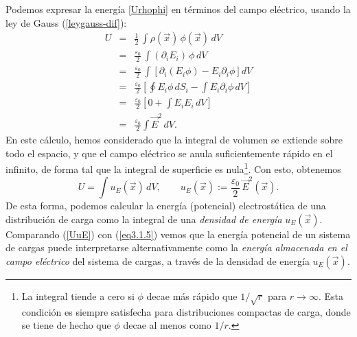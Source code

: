 Podemos expresar la energía \eqref{Urhophi} en términos del campo eléctrico,
usando la ley de Gauss (\ref{leygauss-dif}):
\begin{eqnarray}
U&=&\frac{1}{2}\,\int\rho(\vec{x})\,\phi(\vec{x})\,dV \\
&=&\frac{\varepsilon_0}{2}\,\int(\partial_i E_i)\,\phi\,dV\\
&=&\frac{\varepsilon_0}{2}\,\int\left[
\partial_i(E_i\phi)-E_i\partial_i\phi\right] dV\\
&=&\frac{\varepsilon_0}{2}\left[\oint
E_i\phi\,dS_i-\int E_i\partial_i\phi\, dV\right]\\
&=&\frac{\varepsilon_0}{2}\left[0+\int E_iE_i\, dV\right]\\
&=&\frac{\varepsilon_0}{2}\int \vec{E}^2\, dV.
\end{eqnarray}
En este cálculo, hemos considerado que la integral de volumen se extiende sobre
todo el espacio, y que el campo eléctrico se anula suficientemente rápido en
el infinito, de forma tal que la integral de superficie es nula\footnote{La integral tiende a cero si $\phi$ decae más rápido que $1/\sqrt{r}$ para $r\to\infty$. Esta condición es siempre satisfecha para distribuciones compactas de carga, donde se tiene de hecho que $\phi$ decae al menos como $1/r$.}. Con esto,
obtenemos
\begin{equation} \label{UuE}
\boxed{U=\int u_E(\vec{x})\,dV, \qquad u_E(\vec{x}):=\frac{\varepsilon_0}{2}\,
\vec{E}^2(\vec{x}) .}
\end{equation}
De esta forma, podemos calcular la energía (potencial) electrostática de una
distribución de carga como la integral de una \textit{densidad de energía}
$u_E(\vec{x})$. Comparando (\ref{UuE}) con (\ref{eq3.1.5}) vemos que la
energía potencial de un sistema de cargas puede interpretarse alternativamente
como la \textit{energía almacenada en el campo eléctrico} del sistema de
cargas, a través de la densidad de energía $u_E(\vec{x})$.

